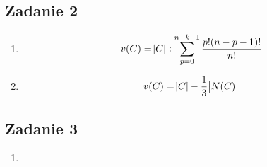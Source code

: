 \documentclass{article}
\begin{document}
\subsection{Zadanie 2}
\begin{enumerate}
    \item
        $$
        v(C) = \abs{C}:
        \sum^{n - k - 1}_{p = 0} \frac{p! (n - p - 1)!}{n!}
        $$
    \item
        $$
        v(C) = \abs{C} - \frac{1}{3} \abs{N(C)}
        $$


\end{enumerate}

\subsection{Zadanie 3}
\begin{enumerate}
    \item
\end{enumerate}
\end{document}
